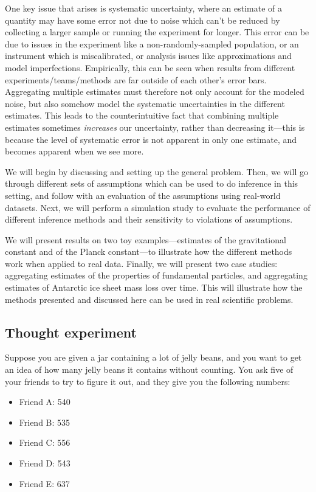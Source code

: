 \documentclass[12pt]{article}
\begin{document}
One key issue that arises is systematic uncertainty, where an estimate of a quantity may have some error not due to noise which can't be reduced by collecting a larger sample or running the experiment for longer. This error can be due to issues in the experiment like a non-randomly-sampled population, or an instrument which is miscalibrated, or analysis issues like approximations and model imperfections. Empirically, this can be seen when results from different experiments/teams/methods are far outside of each other's error bars. Aggregating multiple estimates must therefore not only account for the modeled noise, but also somehow model the systematic uncertainties in the different estimates. This leads to the counterintuitive fact that combining multiple estimates sometimes \emph{increases} our uncertainty, rather than decreasing it---this is because the level of systematic error is not apparent in only one estimate, and becomes apparent when we see more.

We will begin by discussing and setting up the general problem. Then, we will go through different sets of assumptions which can be used to do inference in this setting, and follow with an evaluation of the assumptions using real-world datasets. Next, we will perform a simulation study to evaluate the performance of different inference methods and their sensitivity to violations of assumptions.

We will present results on two toy examples---estimates of the gravitational constant and of the Planck constant---to illustrate how the different methods work when applied to real data. Finally, we will present two case studies: aggregating estimates of the properties of fundamental particles, and aggregating estimates of Antarctic ice sheet mass loss over time. This will illustrate how the methods presented and discussed here can be used in real scientific problems.


\subsection{Thought experiment}\label{thought-experiment}

Suppose you are given a jar containing a lot of jelly beans, and you want to get an idea of how many jelly beans it contains without counting. You ask five of your friends to try to figure it out, and they give you the following numbers:

\begin{itemize}

\item
  Friend A: 540
\item
  Friend B: 535
\item
  Friend C: 556
\item
  Friend D: 543
\item
  Friend E: 637
\end{itemize}
\end{document}
